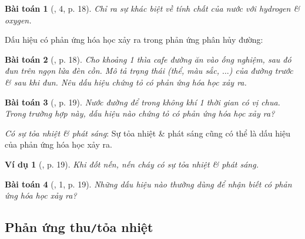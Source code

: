 \documentclass{article}
\newtheorem{baitoan}{Bài toán}
\newtheorem{vidu}{Ví dụ}
\begin{document}
\begin{baitoan}[\cite{SGK_KHTN_8_Canh_Dieu}, 4, p. 18]
	Chỉ ra sự khác biệt về tính chất của nước với hydrogen \& oxygen.
\end{baitoan}
Dấu hiệu có phản ứng hóa học xảy ra trong phản ứng phân hủy đường:

\begin{baitoan}[\cite{SGK_KHTN_8_Canh_Dieu}, p. 18]
	 Cho khoảng 1 thìa cafe đường ăn vào ống nghiệm, sau đó đun trên ngọn lửa đèn cồn. Mô tả trạng thái (thể, màu sắc, $\ldots$) của đường trước \& sau khi đun. Nêu dấu hiệu chứng tỏ có phản ứng hóa học xảy ra.
\end{baitoan}

\begin{baitoan}[\cite{SGK_KHTN_8_Canh_Dieu}, p. 19]
	Nước đường để trong không khí 1 thời gian có vị chua. Trong trường hợp này, dấu hiệu nào chứng tỏ có phản ứng hóa học xảy ra?
\end{baitoan}
 \textit{Có sự tỏa nhiệt \& phát sáng}: Sự tỏa nhiệt \& phát sáng cũng có thể là dấu hiệu của phản ứng hóa học xảy ra.

\begin{vidu}[\cite{SGK_KHTN_8_Canh_Dieu}, p. 19]
	Khi đốt nến, nến cháy có sự tỏa nhiệt \& phát sáng.
\end{vidu}

\begin{baitoan}[\cite{SGK_KHTN_8_Canh_Dieu}, 1, p. 19]
	Những dấu hiệu nào thường dùng để nhận biết có phản ứng hóa học xảy ra?
\end{baitoan}

\subsection{Phản ứng thu\texttt{/}tỏa nhiệt}

\noindent{}
\end{document}
